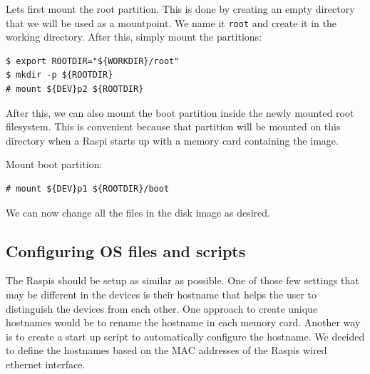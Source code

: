 Lets first mount the root partition. This is done by creating an empty directory
that we will be used as a mountpoint. We name it \texttt{root} and create it in the
working directory.
After this, simply mount the partitions:

\begin{lstlisting}[]
$ export ROOTDIR="${WORKDIR}/root"
$ mkdir -p ${ROOTDIR}
# mount ${DEV}p2 ${ROOTDIR}
\end{lstlisting}
\FloatBarrier
\vspace{-5mm}

After this, we can also mount the boot partition inside the newly mounted
root filesystem. This is convenient because that partition will be mounted
on this directory when a \ac{Raspi} starts up with a memory card containing
the image. %

Mount boot partition:
\begin{lstlisting}[]
# mount ${DEV}p1 ${ROOTDIR}/boot
\end{lstlisting}
\FloatBarrier
\vspace{-5mm}

We can now change all the files in the disk image as desired.



\subsection{Configuring OS files and scripts}

The \ac{Raspi}s should be setup as similar as possible. One of those
few settings that may be different in the devices is their hostname that
helps the user to distinguish the devices from each other.
One approach to create unique hostnames would be to rename the hostname
in each memory card. Another way is to create a start up script to automatically
configure the hostname. We decided to define the hostnames based on the \ac{MAC}
addresses of the \ac{Raspi}s wired ethernet interface.

